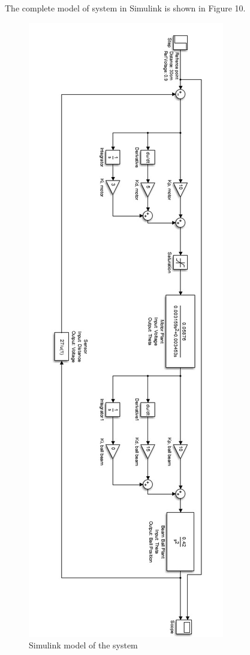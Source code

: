 \documentclass{article}
\begin{document}
The complete model of system in Simulink is shown in Figure 10.
 \begin{figure}[h!]
  \includegraphics[scale=0.7]{simulink2.jpg}
  \caption{Simulink model of the system }
  \label{fig:boat1}
\end{figure}
\end{document}
